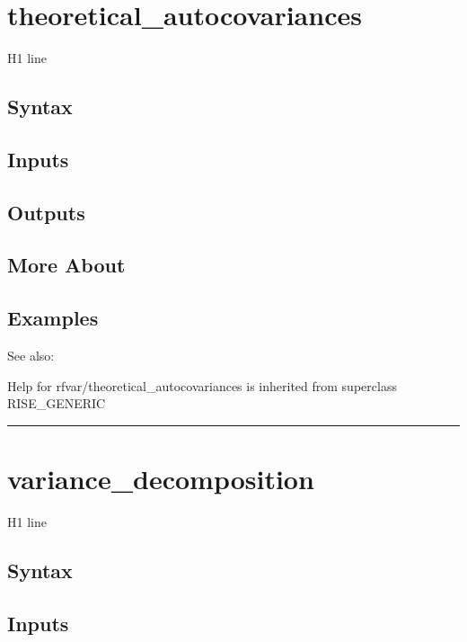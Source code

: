 \documentclass[letterpaper,10pt,english]{sphinxmanual}
\begin{document}
\section{theoretical\_autocovariances}
\label{classes/models/@rfvar/rfvar:theoretical-autocovariances}\label{classes/models/@rfvar/rfvar:id159}
H1 line


\subsection{Syntax}
\label{classes/models/@rfvar/rfvar:id160}

\subsection{Inputs}
\label{classes/models/@rfvar/rfvar:id161}

\subsection{Outputs}
\label{classes/models/@rfvar/rfvar:id162}

\subsection{More About}
\label{classes/models/@rfvar/rfvar:id163}

\subsection{Examples}
\label{classes/models/@rfvar/rfvar:id164}
See also:

Help for rfvar/theoretical\_autocovariances is inherited from superclass RISE\_GENERIC


\bigskip\hrule{}\bigskip



\section{variance\_decomposition}
\label{classes/models/@rfvar/rfvar:variance-decomposition}\label{classes/models/@rfvar/rfvar:id165}
H1 line


\subsection{Syntax}
\label{classes/models/@rfvar/rfvar:id166}

\subsection{Inputs}
\label{classes/models/@rfvar/rfvar:id167}
\end{document}
